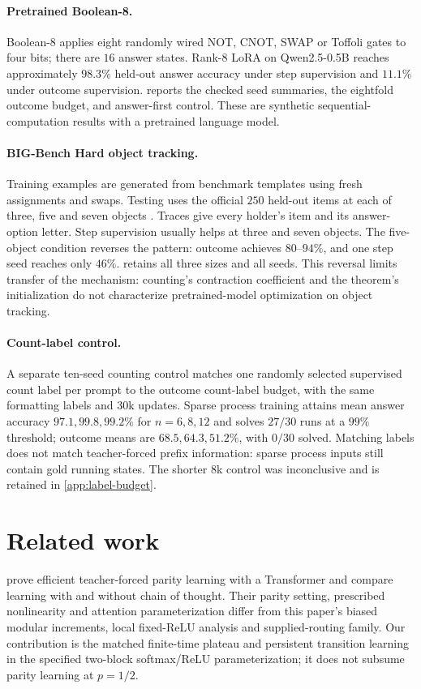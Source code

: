 \paragraph{Pretrained Boolean-8.}
Boolean-8 applies eight randomly wired NOT, CNOT, SWAP or Toffoli gates to four bits; there are $16$ answer states. Rank-$8$ LoRA on Qwen2.5-0.5B \citep{qwen2025qwen25,hu2022lora} reaches approximately $98.3\%$ held-out answer accuracy under step supervision and $11.1\%$ under outcome supervision.  reports the checked seed summaries, the eightfold outcome budget, and answer-first control. These are synthetic sequential-computation results with a pretrained language model.


\paragraph{BIG-Bench Hard object tracking.}
Training examples are generated from benchmark templates using fresh assignments and swaps. Testing uses the official $250$ held-out items at each of three, five and seven objects \citep{suzgun2022challenging}. Traces give every holder's item and its answer-option letter. Step supervision usually helps at three and seven objects. The five-object condition reverses the pattern: outcome achieves $80$--$94\%$, and one step seed reaches only $46\%$.  retains all three sizes and all seeds. This reversal limits transfer of the mechanism: counting's contraction coefficient and the theorem's initialization do not characterize pretrained-model optimization on object tracking.

\paragraph{Count-label control.}
A separate ten-seed counting control matches one randomly selected supervised count label per prompt to the outcome count-label budget, with the same formatting labels and $30$k updates. Sparse process training attains mean answer accuracy $97.1,99.8,99.2\%$ for $n=6,8,12$ and solves $27/30$ runs at a $99\%$ threshold; outcome means are $68.5,64.3,51.2\%$, with $0/30$ solved. Matching labels does not match teacher-forced prefix information: sparse process inputs still contain gold running states. The shorter $8$k control was inconclusive and is retained in \cref{app:label-budget}.


\section{Related work}\label{sec:related}
\citet{kim2024parity} prove efficient teacher-forced parity learning with a Transformer and compare learning with and without chain of thought. Their parity setting, prescribed nonlinearity and attention parameterization differ from this paper's biased modular increments, local fixed-ReLU analysis and supplied-routing family. Our contribution is the matched finite-time plateau and persistent transition learning in the specified two-block softmax/ReLU parameterization; it does not subsume parity learning at $p=1/2$.

